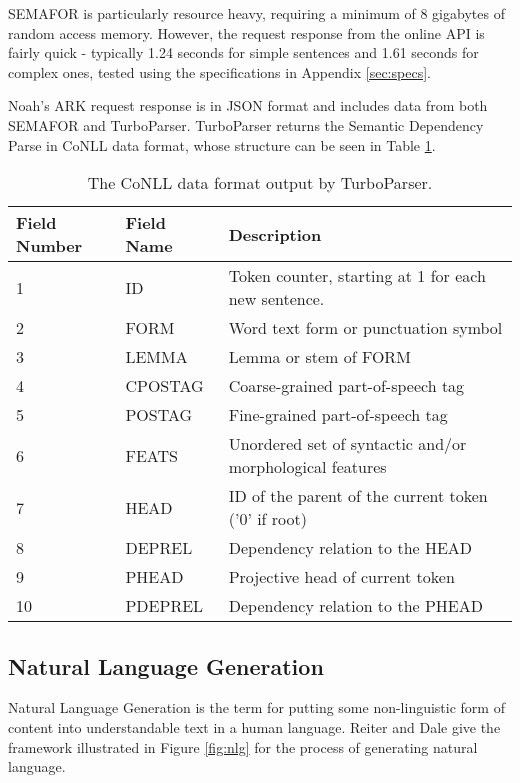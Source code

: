 SEMAFOR is particularly resource heavy, requiring a minimum of 8 gigabytes of random access memory. However, the request response from the online API is fairly quick - typically 1.24 seconds for simple sentences and 1.61 seconds for complex ones, tested using the specifications in Appendix \ref{sec:specs}.

Noah's ARK request response is in JSON format and includes data from both SEMAFOR and TurboParser. TurboParser returns the Semantic Dependency Parse in CoNLL data format, whose structure can be seen in Table \ref{tab:CoNLL}. 

\begin{table}
\centering
    \begin{tabular}{|l|l|l|}
    \hline
    Field Number & Field Name & Description                                                \\ \hline
    1            & ID         & Token counter, starting at 1 for each new sentence.        \\
    2            & FORM       & Word text form or punctuation symbol                       \\
    3            & LEMMA      & Lemma or stem of FORM                                      \\
    4            & CPOSTAG    & Coarse-grained part-of-speech tag                          \\
    5            & POSTAG     & Fine-grained part-of-speech tag                            \\
    6            & FEATS      & Unordered set of syntactic and/or morphological features   \\
    7            & HEAD       & ID of the parent of the current token ('0' if root)        \\
    8            & DEPREL     & Dependency relation to the HEAD                            \\
    9            & PHEAD      & Projective head of current token                           \\
    10           & PDEPREL    & Dependency relation to the PHEAD                           \\ \hline
    \end{tabular}
\caption{The CoNLL data format output by TurboParser.}
\label{tab:CoNLL}
\end{table}


\subsection{Natural Language Generation}
\label{sec:bg-nlg}
Natural Language Generation is the term for putting some non-linguistic form of content into understandable text in a human language. Reiter and Dale give the framework\cite{reiter2000building} illustrated in Figure \ref{fig:nlg} for the process of generating natural language.

